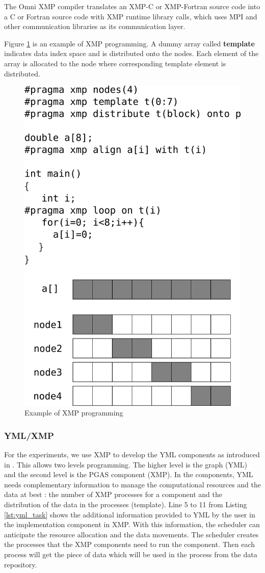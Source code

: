 The Omni XMP compiler translates an XMP-C or XMP-Fortran source code into a C or Fortran source code with XMP runtime library calls, which uses MPI and other communication libraries as its communication layer.

Figure \ref{fig:xmpprog} is an example of XMP programming.
A dummy array called {\bf template} indicates data index space and is distributed onto the nodes.
Each element of the array is allocated to the node where corresponding template element is distributed.

\begin{figure}
	\centering
	\includegraphics[width=.35\textwidth]{xmp-example.pdf}
	\caption{Example of XMP programming\label{fig:xmpprog}}
\end{figure}

\subsubsection{YML/XMP}
For the experiments, we use XMP to develop the YML components as introduced in \cite{TsSHP2013}.
This allows two levels programming.
The higher level is the graph (YML) and the second level is the PGAS component (XMP).
In the components, YML needs complementary information to manage the computational resources and the data at best : the number of XMP processes for a component and the distribution of the data in the processes (template).
Line 5 to 11 from Listing \ref{lst:yml_task} shows the additional information provided to YML by the user in the implementation component in XMP.
With this information, the scheduler can anticipate the resource allocation and the data movements.
The scheduler creates the processes that the XMP components need to run the component.
Then each process will get the piece of data which will be used in the process from the data repository.

